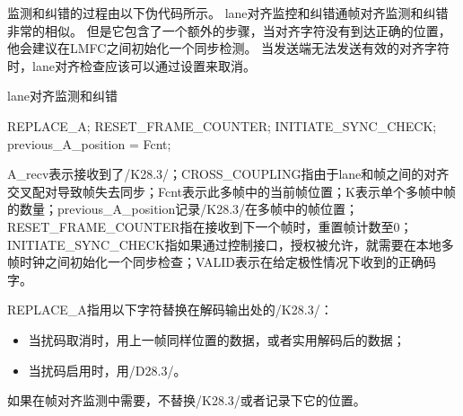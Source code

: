 \documentclass[UTF8]{ctexart}
\begin{document}
监测和纠错的过程由以下伪代码所示。
lane对齐监控和纠错通帧对齐监测和纠错非常的相似。
但是它包含了一个额外的步骤，当对齐字符没有到达正确的位置，他会建议在LMFC之间初始化一个同步检测。
当发送端无法发送有效的对齐字符时，lane对齐检查应该可以通过设置来取消。

\begin{algorithm}[H]
	\caption{lane对齐监测和纠错}
    \begin{algorithmic}[1]
    		\State REPLACE\_A;
    			\State RESET\_FRAME\_COUNTER;
    				\State INITIATE\_SYNC\_CHECK;
    			\EndIf
    		\EndIf
    			\State previous\_A\_position = Fcnt;
    		\EndIf
    	\EndIf
    \end{algorithmic}
\end{algorithm}

A\_recv表示接收到了/K28.3/；CROSS\_COUPLING指由于lane和帧之间的对齐交叉配对导致帧失去同步；Fcnt表示此多帧中的当前帧位置；K表示单个多帧中帧的数量；previous\_A\_position记录/K28.3/在多帧中的帧位置；RESET\_FRAME\_COUNTER指在接收到下一个帧时，重置帧计数至0；INITIATE\_SYNC\_CHECK指如果通过控制接口，授权被允许，就需要在本地多帧时钟之间初始化一个同步检查；VALID表示在给定极性情况下收到的正确码字。

REPLACE\_A指用以下字符替换在解码输出处的/K28.3/：
\begin{itemize}
	\item 当扰码取消时，用上一帧同样位置的数据，或者实用解码后的数据；
	\item 当扰码启用时，用/D28.3/。
\end{itemize}
如果在帧对齐监测中需要，不替换/K28.3/或者记录下它的位置。


\end{document}
